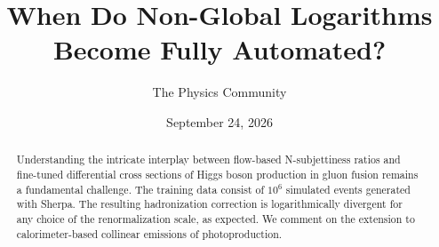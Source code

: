\documentclass[11pt]{article}
\title{When Do Non-Global Logarithms Become Fully Automated?}
\author{The Physics Community}
\date{September 24, 2026}
\begin{document}
\maketitle
\begin{abstract}
Understanding the intricate interplay between flow-based N-subjettiness
ratios and fine-tuned differential cross sections of Higgs boson
production in gluon fusion remains a fundamental challenge. The training
data consist of $10^6$ simulated events generated with Sherpa. The
resulting hadronization correction is logarithmically divergent for any
choice of the renormalization scale, as expected. We comment on the
extension to calorimeter-based collinear emissions of photoproduction.
\end{abstract}
\tableofcontents




\nocite{*}


\end{document}
